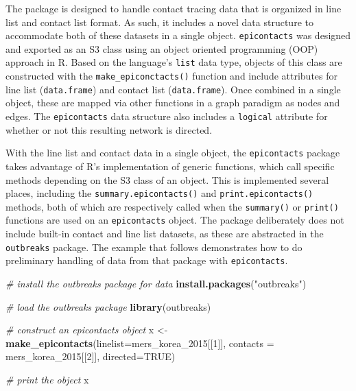 \documentclass[9pt,a4paper,]{extarticle}
\newenvironment{Shaded}{\begin{snugshade}}{\end{snugshade}}
\newcommand{\KeywordTok}[1]{\textcolor[rgb]{0.13,0.29,0.53}{\textbf{#1}}}
\newcommand{\DataTypeTok}[1]{\textcolor[rgb]{0.13,0.29,0.53}{#1}}
\newcommand{\DecValTok}[1]{\textcolor[rgb]{0.00,0.00,0.81}{#1}}
\newcommand{\StringTok}[1]{\textcolor[rgb]{0.31,0.60,0.02}{#1}}
\newcommand{\CommentTok}[1]{\textcolor[rgb]{0.56,0.35,0.01}{\textit{#1}}}
\newcommand{\OtherTok}[1]{\textcolor[rgb]{0.56,0.35,0.01}{#1}}
\newcommand{\NormalTok}[1]{#1}
\theoremstyle{definition}
\theoremstyle{definition}
\theoremstyle{definition}
\theoremstyle{remark}
\begin{document}
The package is designed to handle contact tracing data that is organized in line list and contact list format. As such, it includes a novel data structure to accommodate both of these datasets in a single object. \texttt{epicontacts} was designed and exported as an S3 class using an object oriented programming (OOP) approach in R. Based on the language's \texttt{list} data type, objects of this class are constructed with the \texttt{make\_epiconctacts()} function and include attributes for line list (\texttt{data.frame}) and contact list (\texttt{data.frame}). Once combined in a single object, these are mapped via other functions in a graph paradigm as nodes and edges. The \texttt{epicontacts} data structure also includes a \texttt{logical} attribute for whether or not this resulting network is directed.

With the line list and contact data in a single object, the \texttt{epicontacts} package takes advantage of R's implementation of generic functions, which call specific methods depending on the S3 class of an object. This is implemented several places, including the \texttt{summary.epicontacts()} and \texttt{print.epicontacts()} methods, both of which are respectively called when the \texttt{summary()} or \texttt{print()} functions are used on an \texttt{epicontacts} object. The package deliberately does not include built-in contact and line list datasets, as these are abstracted in the \texttt{outbreaks} package\citep{outbreaks}. The example that follows demonstrates how to do preliminary handling of data from that package with \texttt{epicontacts}.

\begin{Shaded}
\begin{Highlighting}[]
\CommentTok{# install the outbreaks package for data}
\KeywordTok{install.packages}\NormalTok{(}\StringTok{"outbreaks"}\NormalTok{)}
\end{Highlighting}
\end{Shaded}

\begin{Shaded}
\begin{Highlighting}[]
\CommentTok{# load the outbreaks package}
\KeywordTok{library}\NormalTok{(outbreaks)}

\CommentTok{# construct an epicontacts object}
\NormalTok{x <-}\StringTok{ }\KeywordTok{make_epicontacts}\NormalTok{(}\DataTypeTok{linelist=}\NormalTok{mers_korea_}\DecValTok{2015}\NormalTok{[[}\DecValTok{1}\NormalTok{]],}
                      \DataTypeTok{contacts =}\NormalTok{ mers_korea_}\DecValTok{2015}\NormalTok{[[}\DecValTok{2}\NormalTok{]],}
                      \DataTypeTok{directed=}\OtherTok{TRUE}\NormalTok{)}

\CommentTok{# print the object   }
\NormalTok{x               }
\end{Highlighting}
\end{Shaded}
\end{document}
